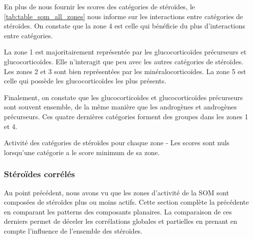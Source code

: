     En plus de nous fournir les scores des catégories de stéroïdes, le \autoref{tab:table_som_all_zones} nous informe sur les interactions entre catégories de stéroïdes. On constate que la zone 4 est celle qui bénéficie du plus d'interactions entre catégories.

    La zone 1 est majoritairement représentée par les glucocorticoïdes précurseurs et glucocorticoïdes. Elle n'interagit que peu avec les autres catégories de stéroïdes. Les zones 2 et 3 sont bien représentées par les minéralocorticoïdes. La zone 5 est celle qui possède les glucocorticoïdes les plus présents.

    Finalement, on constate que les glucocorticoïdes et glucocorticoïdes précurseurs sont souvent ensemble, de la même manière que les androgènes et androgènes précurseurs. Ces quatre dernières catégories forment des groupes dans les zones 1 et 4. 

    \begin{table}[H]
        \centering
        
        \caption{Activité des catégories de stéroïdes pour chaque zone - Les scores sont nuls lorsqu’une catégorie a le score minimum de sa zone.}
        \label{tab:som_all_zone}
    \end{table}


\subsubsection*{Stéroïdes corrélés}
    


    Au point précédent, nous avons vu que les zones d'activité de la SOM sont composées de stéroïdes plus ou moins actifs. Cette section complète la précédente en comparant les patterns des composants planaires. La comparaison de ces derniers permet de déceler les corrélations globales et partielles en prenant en compte l'influence de l'ensemble des stéroïdes.

